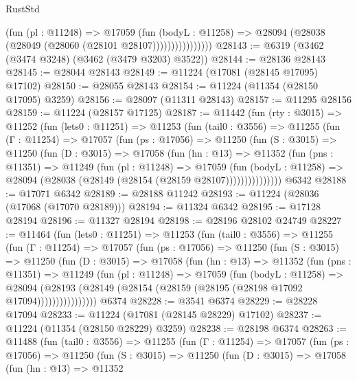 \begin{lexlean}{RustStd}
\begin{coremodule}
                        (fun (pl : @11248) =>
                        @17059
                          (fun (bodyL : @11258) =>
                          @28094 (@28038 (@28049 (@28060 (@28101 @28107))))))))))))))))
@28143 := @6319 (@3462 (@3474 @3248) (@3462 (@3479 @3203) @3522))
@28144 := @28136 @28143
@28145 := @28044 @28143
@28149 := @11224 (@17081 (@28145 @17095) @17102)
@28150 := @28055 @28143
@28154 := @11224 (@11354 (@28150 @17095) @3259)
@28156 := @28097 (@11311 @28143)
@28157 := @11295 @28156
@28159 := @11224 (@28157 @17125)
@28187 := @11442
    (fun (rty : @3015) =>
    @11252
      (fun (lets0 : @11251) =>
      @11253
        (fun (tail0 : @3556) =>
        @11255
          (fun (Γ : @11254) =>
          @17057
            (fun (ps : @17056) =>
            @11250
              (fun (S : @3015) =>
              @11250
                (fun (D : @3015) =>
                @17058
                  (fun (hn : @13) =>
                  @11352
                    (fun (pns : @11351) =>
                    @11249
                      (fun (pl : @11248) =>
                      @17059
                        (fun (bodyL : @11258) =>
                        @28094 (@28038 (@28149 (@28154 (@28159 @28107)))))))))))))))
    @6342
@28188 := @17071 @6342
@28189 := @28188 @11242
@28193 := @11224 (@28036 (@17068 (@17070 @28189)))
@28194 := @11324 @6342
@28195 := @17128 @28194
@28196 := @11327 @28194
@28198 := @28196 @28102 @24749
@28227 := @11464
    (fun (lets0 : @11251) =>
    @11253
      (fun (tail0 : @3556) =>
      @11255
        (fun (Γ : @11254) =>
        @17057
          (fun (ps : @17056) =>
          @11250
            (fun (S : @3015) =>
            @11250
              (fun (D : @3015) =>
              @17058
                (fun (hn : @13) =>
                @11352
                  (fun (pns : @11351) =>
                  @11249
                    (fun (pl : @11248) =>
                    @17059
                      (fun (bodyL : @11258) =>
                      @28094
                        (@28193
                          (@28149 (@28154 (@28159 (@28195 (@28198 @17092 @17094))))))))))))))))
    @6374
@28228 := @3541 @6374
@28229 := @28228 @17094
@28233 := @11224 (@17081 (@28145 @28229) @17102)
@28237 := @11224 (@11354 (@28150 @28229) @3259)
@28238 := @28198 @6374
@28263 := @11488
    (fun (tail0 : @3556) =>
    @11255
      (fun (Γ : @11254) =>
      @17057
        (fun (ps : @17056) =>
        @11250
          (fun (S : @3015) =>
          @11250
            (fun (D : @3015) =>
            @17058
              (fun (hn : @13) =>
              @11352

\end{coremodule}
\end{lexlean}
